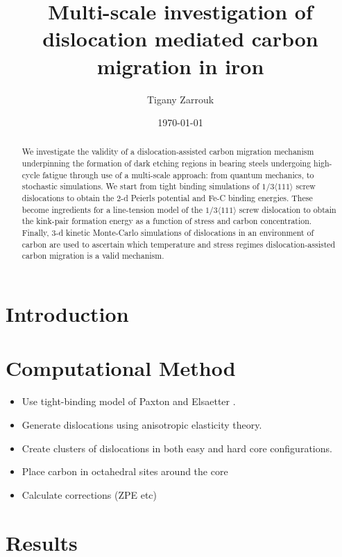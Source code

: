 \documentclass[a4paper]{article}
\author{Tigany Zarrouk}
\date{\today}
\title{Multi-scale investigation of dislocation mediated carbon migration in iron}
\begin{document}
\maketitle
\tableofcontents

\begin{abstract}

We investigate the validity of a dislocation-assisted carbon migration
mechanism underpinning the formation of dark etching regions in
bearing steels undergoing high-cycle fatigue through use of a
multi-scale approach: from quantum mechanics,
to stochastic simulations. We start from tight binding simulations of
$1/3\langle 111 \rangle$ screw dislocations to obtain the 2-d Peierls
potential and Fe-C binding energies. These become ingredients for a line-tension
model of the $1/3\langle 111 \rangle$ screw dislocation to obtain the kink-pair formation
energy as a function of stress and carbon concentration. Finally,
3-d kinetic Monte-Carlo simulations of dislocations in an environment
of carbon are used to ascertain which temperature and stress regimes
dislocation-assisted carbon migration is a valid mechanism. 

\end{abstract}


\section{Introduction}
\label{sec:org09a1465}

\section{Computational Method}
\label{sec:orgf5af0fc}

\begin{itemize}
\item Use tight-binding model of Paxton and Elsaetter \cite{Paxton2013}.
\item Generate dislocations using anisotropic elasticity theory.
\item Create clusters of dislocations in both easy and hard core
configurations.
\item Place carbon in octahedral sites around the core
\item Calculate corrections (ZPE etc)
\end{itemize}


\section{Results}
\label{sec:org8dda13d}
\end{document}
